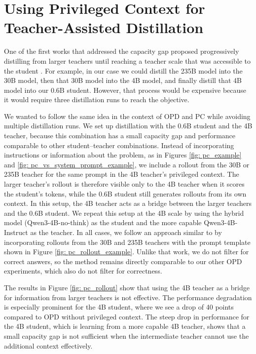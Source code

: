 \FloatBarrier

\section{Using Privileged Context for Teacher-Assisted Distillation} \label{sec: exps_teacher_assisted_pc}

One of the first works that addressed the capacity gap proposed progressively distilling from larger teachers until reaching a teacher scale that was accessible to the student \citep{mirzadehImprovedKnowledgeDistillation2019}. For example, in our case we could distill the 235B model into the 30B model, then that 30B model into the 4B model, and finally distill that 4B model into our 0.6B student. However, that process would be expensive because it would require three distillation runs to reach the objective.

We wanted to follow the same idea in the context of OPD and PC while avoiding multiple distillation runs. We set up distillation with the 0.6B student and the 4B teacher, because this combination has a small capacity gap and performance comparable to other student--teacher combinations. Instead of incorporating instructions or information about the problem, as in Figures \ref{fig: pc_example} and \ref{fig: pc_vs_system_prompt_example}, we include a rollout from the 30B or 235B teacher for the same prompt in the 4B teacher's privileged context. The larger teacher's rollout is therefore visible only to the 4B teacher when it scores the student's tokens, while the 0.6B student still generates rollouts from its own context. In this setup, the 4B teacher acts as a bridge between the larger teachers and the 0.6B student. We repeat this setup at the 4B scale by using the hybrid model (Qwen3-4B-no-think) as the student and the more capable Qwen3-4B-Instruct as the teacher. In all cases, we follow an approach similar to \citet{shenfeldSelfDistillationEnablesContinual2026} by incorporating rollouts from the 30B and 235B teachers with the prompt template shown in Figure \ref{fig: pc_rollout_example}. Unlike that work, we do not filter for correct answers, so the method remains directly comparable to our other OPD experiments, which also do not filter for correctness.

The results in Figure \ref{fig: pc_rollout} show that using the 4B teacher as a bridge for information from larger teachers is not effective. The performance degradation is especially prominent for the 4B student, where we see a drop of 40 points compared to OPD without privileged context. The steep drop in performance for the 4B student, which is learning from a more capable 4B teacher, shows that a small capacity gap is not sufficient when the intermediate teacher cannot use the additional context effectively.

